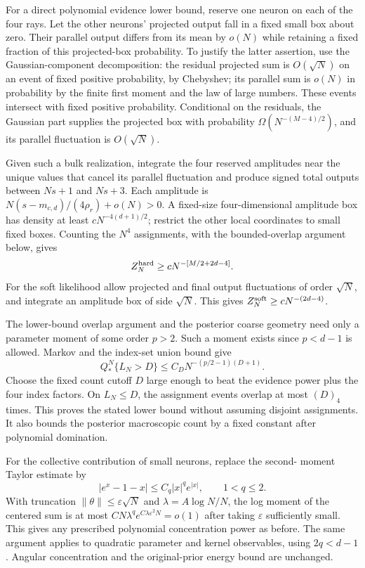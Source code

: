 \documentclass[11pt]{article}
\begin{document}
For a direct polynomial evidence lower bound, reserve one neuron on each
of the four rays. Let the other neurons' projected output fall in a fixed
small box about zero. Their parallel output differs from its mean by
$o(N)$ while retaining a fixed fraction of this projected-box probability.
To justify the latter assertion, use the Gaussian-component decomposition:
the residual projected sum is $O(\sqrt N)$ on an event of fixed positive
probability, by Chebyshev; its parallel sum is $o(N)$ in probability by
the finite first moment and the law of large numbers. These events
intersect with fixed positive probability. Conditional on the residuals,
the Gaussian part supplies the projected box with probability
$\Omega(N^{-(M-4)/2})$, and its parallel fluctuation is $O(\sqrt N)$.

Given such a bulk realization, integrate the four reserved amplitudes
near the unique values that cancel its parallel fluctuation and produce
signed total outputs between $Ns+1$ and $Ns+3$. Each amplitude is
$N(s-m_{c,d})/(4\rho_r)+o(N)>0$. A fixed-size four-dimensional amplitude
box has density at least $cN^{-4(d+1)/2}$; restrict the other local
coordinates to small fixed boxes. Counting the $N^4$ assignments, with
the bounded-overlap argument below, gives
\[
 Z_N^{\rm hard}\ge cN^{-[M/2+2d-4]}.
\]
For the soft likelihood allow projected and final output fluctuations
of order $\sqrt N$, and integrate an amplitude box of side $\sqrt N$.
This gives $Z_N^{\rm soft}\ge cN^{-(2d-4)}$.

The lower-bound overlap argument and the posterior coarse geometry need
only a parameter moment of some order $p>2$. Such a moment exists since
$p<d-1$ is allowed. Markov and the index-set union bound give
\[
 Q_*^N\{L_N>D\}\le C_DN^{-(p/2-1)(D+1)}.
\]
Choose the fixed count cutoff $D$ large enough to beat the evidence
power plus the four index factors. On $L_N\le D$, the assignment
events overlap at most $(D)_4$ times. This proves the stated lower bound
without assuming disjoint assignments. It also bounds the posterior
macroscopic count by a fixed constant after polynomial domination.

For the collective contribution of small neurons, replace the second-
moment Taylor estimate by
\[
 |e^x-1-x|\le C_q|x|^q e^{|x|},\qquad 1<q\le2.
\]
With truncation $\|\theta\|\le\varepsilon\sqrt N$ and
$\lambda=A\log N/N$, the log moment of the centered sum is at most
$C N\lambda^q e^{C\lambda\varepsilon^2N}=o(1)$ after taking
$\varepsilon$ sufficiently small. This gives any prescribed polynomial
concentration power as before. The same argument applies to quadratic
parameter and kernel observables, using $2q<d-1$.
Angular concentration and the original-prior energy bound are unchanged.
\end{document}

